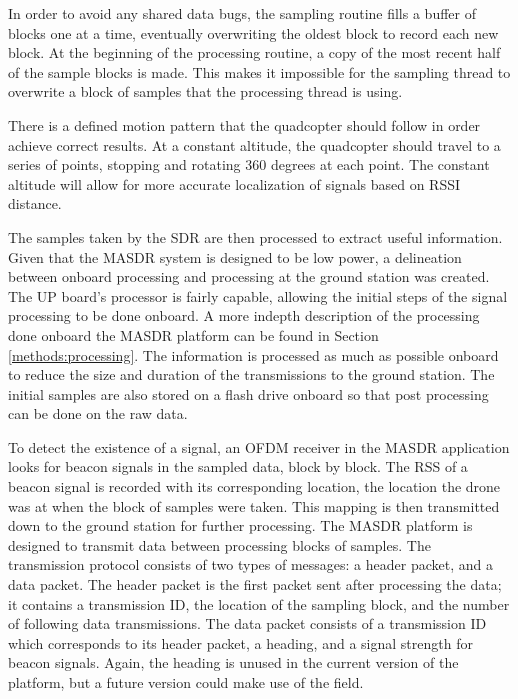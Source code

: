 In order to avoid any shared data bugs, the sampling routine fills a buffer of blocks one at a time, eventually overwriting the oldest block to record each new block. At the beginning of the processing routine, a copy of the most recent half of the sample blocks is made. This makes it impossible for the sampling thread to overwrite a block of samples that the processing thread is using. \par
There is a defined motion pattern that the quadcopter should follow in order achieve correct results. At a constant altitude, the quadcopter should travel to a series of points, stopping and rotating 360 degrees at each point. The constant altitude will allow for more accurate localization of signals based on RSSI distance. \par
The samples taken by the SDR are then processed to extract useful information. Given that the MASDR system is designed to be low power, a delineation between onboard processing and processing at the ground station was created. The UP board’s processor is fairly capable, allowing the initial steps of the signal processing to be done onboard. A more indepth description of the processing done onboard the MASDR platform can be found in Section \ref{methods:processing}. The information is processed as much as possible onboard to reduce the size and duration of the transmissions to the ground station. The initial samples are also stored on a flash drive onboard so that post processing can be done on the raw data. \par
To detect the existence of a signal, an OFDM receiver in the MASDR application looks for beacon signals in the sampled data, block by block. The RSS of a beacon signal is recorded with its corresponding location, the location the drone was at when the block of samples were taken. This mapping is then transmitted down to the ground station for further processing.
The MASDR platform is designed to transmit data between processing blocks of samples. The transmission protocol consists of two types of messages: a header packet, and a data packet. The header packet is the first packet sent after processing the data; it contains a transmission ID, the location of the sampling block, and the number of following data transmissions. The data packet consists of a transmission ID which corresponds to its header packet, a heading, and a signal strength for beacon signals. Again, the heading is unused in the current version of the platform, but a future version could make use of the field.

